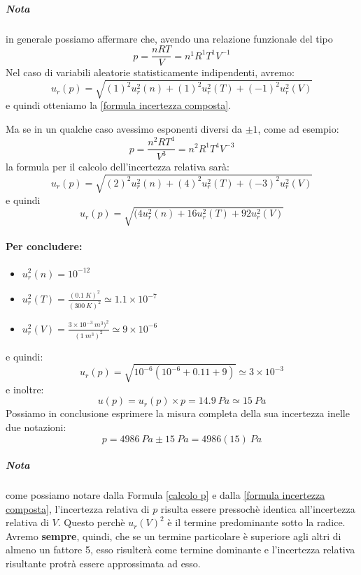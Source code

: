 \documentclass[a4paper,11pt]{report}
\begin{document}
\subparagraph*{Nota} in generale possiamo affermare che, avendo una relazione funzionale del tipo
$$
  p = \frac{nRT}{V} = n^1 R^1 T^1 V^{-1}
$$
Nel caso di variabili aleatorie statisticamente indipendenti, avremo:
$$
  u_r(p) = \sqrt{(1)^2u_r^2(n)+(1)^2u_r^2(T)+(-1)^2u_r^2(V)}
$$ e quindi otteniamo la \ref{formula incertezza composta}.

Ma se in un qualche caso avessimo esponenti diversi da $\pm 1$, come ad esempio:
$$
  p = \frac{n^2 R T^4}{V^3} = n^2 R^1 T^4 V^{-3}  
$$
la formula per il calcolo dell'incertezza relativa sarà:
$$
  u_r(p) = \sqrt{(2)^2u_r^2(n)+(4)^2u_r^2(T)+(-3)^2u_r^2(V)}
$$ e quindi
$$
  u_r(p) = \sqrt{(4u_r^2(n)+16u_r^2(T)+92u_r^2(V)}  
$$
\paragraph{Per concludere:}
\begin{itemize}
  \item $u_r^2(n) = 10^{-12}$
  \item $u_r^2(T) = \frac{(0.1~K)^2}{(300~K)^2} \simeq 1.1\times 10^{-7}$
  \item $u_r^2(V) = \frac{3\times 10^{-3}~ m^3)^2}{(1~m^3)^2} \simeq 9\times 10^{-6}$
\end{itemize}
e quindi:
\begin{equation}
  \label{calcolo p}
  u_r(p) = \sqrt{10^{-6}(10^{-6}+0.11+9)} \simeq 3\times 10^{-3}
\end{equation}
e inoltre:
$$
  u(p) = u_r(p)\times p = 14.9~ Pa \simeq 15~Pa
$$
Possiamo in conclusione esprimere la misura completa della sua incertezza inelle due notazioni:
$$
  p = 4986~ Pa\pm 15~ Pa = 4986(15)~ Pa
$$
\subparagraph{Nota} come possiamo notare dalla Formula \ref{calcolo p} e dalla \ref{formula incertezza composta}, l'incertezza relativa di $p$ risulta essere pressochè identica all'incertezza relativa di $V$. Questo perchè $u_r(V)^2$ è il termine predominante sotto la radice. Avremo \textbf{sempre}, quindi, che se un termine particolare è superiore agli altri di almeno un fattore 5, esso risulterà come termine dominante e l'incertezza relativa risultante protrà essere approssimata ad esso.
\end{document}
